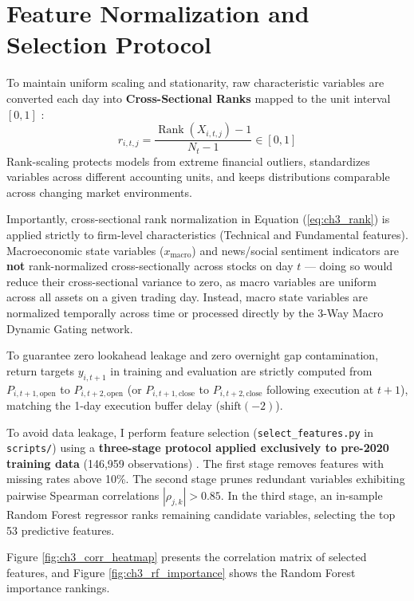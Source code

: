 \section{Feature Normalization and Selection Protocol}
To maintain uniform scaling and stationarity, raw characteristic variables are converted each day into \textbf{Cross-Sectional Ranks} mapped to the unit interval $[0, 1]$ \citep{freyberger2020dissecting, gu2020empirical}:
\begin{equation}
r_{i,t,j} = \frac{\operatorname{Rank}(X_{i,t,j}) - 1}{N_t - 1} \in [0, 1]
\label{eq:ch3_rank}
\end{equation}
Rank-scaling protects models from extreme financial outliers, standardizes variables across different accounting units, and keeps distributions comparable across changing market environments.

Importantly, cross-sectional rank normalization in Equation (\ref{eq:ch3_rank}) is applied strictly to firm-level characteristics (Technical and Fundamental features). Macroeconomic state variables ($x_{\text{macro}}$) and news/social sentiment indicators are \textbf{not} rank-normalized cross-sectionally across stocks on day $t$ — doing so would reduce their cross-sectional variance to zero, as macro variables are uniform across all assets on a given trading day. Instead, macro state variables are normalized temporally across time or processed directly by the 3-Way Macro Dynamic Gating network.

To guarantee zero lookahead leakage and zero overnight gap contamination, return targets $y_{i,t+1}$ in training and evaluation are strictly computed from $P_{i, t+1, \text{open}}$ to $P_{i, t+2, \text{open}}$ (or $P_{i, t+1, \text{close}}$ to $P_{i, t+2, \text{close}}$ following execution at $t+1$), matching the 1-day execution buffer delay ($\text{shift}(-2)$).

To avoid data leakage, I perform feature selection (\texttt{select\_features.py} in \texttt{scripts/}) using a \textbf{three-stage protocol applied exclusively to pre-2020 training data} (146,959 observations) \citep{lopez2018advances}. The first stage removes features with missing rates above 10\%. The second stage prunes redundant variables exhibiting pairwise Spearman correlations $|\rho_{j,k}| > 0.85$. In the third stage, an in-sample Random Forest regressor \citep{breiman2001random} ranks remaining candidate variables, selecting the top 53 predictive features.

Figure \ref{fig:ch3_corr_heatmap} presents the correlation matrix of selected features, and Figure \ref{fig:ch3_rf_importance} shows the Random Forest importance rankings.

